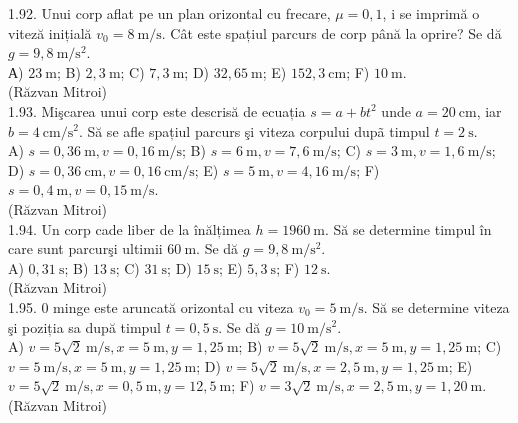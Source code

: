 1.92. Unui corp aflat pe un plan orizontal cu frecare, $\mu=0,1$, i se imprimă o viteză inițială $v_{0}=8 \mathrm{~m} / \mathrm{s}$. Cât este spațiul parcurs de corp până la oprire? Se dă $g=9,8 \mathrm{~m} / \mathrm{s}^{2}$.\\ А) $23 \mathrm{~m}$; B) $2,3 \mathrm{~m}$; C) $7,3 \mathrm{~m}$; D) $32,65 \mathrm{~m}$; E) $152,3 \mathrm{~cm}$; F) $10 \mathrm{~m}$.\\ (Răzvan Mitroi)\\

1.93. Mişcarea unui corp este descrisă de ecuația $s=a+b t^{2}$ unde $a=20 \mathrm{~cm}$, iar $b=4 \mathrm{~cm} / \mathrm{s}^{2}$. Să se afle spațiul parcurs şi viteza corpului dupã timpul $t=2 \mathrm{~s}$.\\ A) $s=0,36 \mathrm{~m}, v=0,16 \mathrm{~m} / \mathrm{s}$; B) $s=6 \mathrm{~m}, v=7,6 \mathrm{~m} / \mathrm{s}$; C) $s=3 \mathrm{~m}, v=1,6 \mathrm{~m} / \mathrm{s}$; D) $s=0,36 \mathrm{~cm}, v=0,16 \mathrm{~cm} / \mathrm{s}$; E) $s=5 \mathrm{~m}, v=4,16 \mathrm{~m} / \mathrm{s}$; F) $s=0,4 \mathrm{~m}, v=0,15 \mathrm{~m} / \mathrm{s}$.\\ (Răzvan Mitroi)\\

1.94. Un corp cade liber de la înălțimea $h=1960 \mathrm{~m}$. Să se determine timpul în care sunt parcurşi ultimii $60 \mathrm{~m}$. Se dă $g=9,8 \mathrm{~m} / \mathrm{s}^{2}$.\\ A) $0,31 \mathrm{~s}$; B) $13 \mathrm{~s}$; C) $31 \mathrm{~s}$; D) $15 \mathrm{~s}$; E) $5,3 \mathrm{~s}$; F) $12 \mathrm{~s}$.\\ (Răzvan Mitroi)\\

1.95. 0 minge este aruncată orizontal cu viteza $v_{0}=5 \mathrm{~m} / \mathrm{s}$. Să se determine viteza şi poziția sa după timpul $t=0,5 \mathrm{~s}$. Se dă $g=10 \mathrm{~m} / \mathrm{s}^{2}$.\\ A) $v=5 \sqrt{2} \mathrm{~m} / \mathrm{s}, x=5 \mathrm{~m}, y=1,25 \mathrm{~m}$; B) $v=5 \sqrt{2} \mathrm{~m} / \mathrm{s}, x=5 \mathrm{~m}, y=1,25 \mathrm{~m}$; C) $v=5 \mathrm{~m} / \mathrm{s}, x=5 \mathrm{~m}, y=1,25 \mathrm{~m}$; D) $v=5 \sqrt{2} \mathrm{~m} / \mathrm{s}, x=2,5 \mathrm{~m}, y=1,25 \mathrm{~m}$; E) $v=5 \sqrt{2} \mathrm{~m} / \mathrm{s}, x=0,5 \mathrm{~m}, y=12,5 \mathrm{~m}$; F) $v=3 \sqrt{2} \mathrm{~m} / \mathrm{s}, x=2,5 \mathrm{~m}, y=1,20 \mathrm{~m}$.\\ (Răzvan Mitroi)\\

